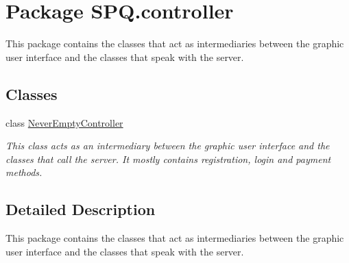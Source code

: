 \hypertarget{namespace_s_p_q_1_1controller}{}\section{Package S\+P\+Q.\+controller}
\label{namespace_s_p_q_1_1controller}


This package contains the classes that act as intermediaries between the graphic user interface and the classes that speak with the server.  


\subsection*{Classes}
\begin{DoxyCompactItemize}
\item 
class \mbox{\hyperlink{class_s_p_q_1_1controller_1_1_never_empty_controller}{Never\+Empty\+Controller}}
\begin{DoxyCompactList}\small\item\em This class acts as an intermediary between the graphic user interface and the classes that call the server. It mostly contains registration, login and payment methods. \end{DoxyCompactList}\end{DoxyCompactItemize}


\subsection{Detailed Description}
This package contains the classes that act as intermediaries between the graphic user interface and the classes that speak with the server. 
